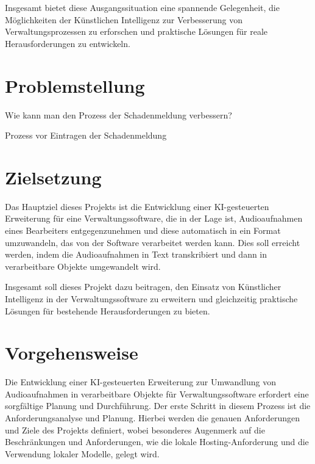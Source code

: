 \documentclass[12pt,a4paper,parskip=full]{scrartcl}
\begin{document}
Insgesamt bietet diese Ausgangssituation eine spannende Gelegenheit, die Möglichkeiten der Künstlichen Intelligenz zur Verbesserung von Verwaltungsprozessen zu erforschen und praktische Lösungen für reale Herausforderungen zu entwickeln.


\section*{Problemstellung}
Wie kann man den Prozess der Schadenmeldung verbessern?

Prozess vor Eintragen der Schadenmeldung

\section*{Zielsetzung}
Das Hauptziel dieses Projekts ist die Entwicklung einer KI-gesteuerten Erweiterung für eine Verwaltungssoftware, die in der Lage ist, Audioaufnahmen eines Bearbeiters entgegenzunehmen und diese automatisch in ein Format umzuwandeln, das von der Software verarbeitet werden kann.
Dies soll erreicht werden, indem die Audioaufnahmen in Text transkribiert und dann in verarbeitbare Objekte umgewandelt wird.




Insgesamt soll dieses Projekt dazu beitragen, den Einsatz von Künstlicher Intelligenz in der Verwaltungssoftware zu erweitern und gleichzeitig praktische Lösungen für bestehende Herausforderungen zu bieten.

\section*{Vorgehensweise}
Die Entwicklung einer KI-gesteuerten Erweiterung zur Umwandlung von Audioaufnahmen in verarbeitbare Objekte für Verwaltungssoftware erfordert eine sorgfältige Planung und Durchführung.
Der erste Schritt in diesem Prozess ist die Anforderungsanalyse und Planung.
Hierbei werden die genauen Anforderungen und Ziele des Projekts definiert, wobei besonderes Augenmerk auf die Beschränkungen und Anforderungen, wie die lokale Hosting-Anforderung und die Verwendung lokaler Modelle, gelegt wird.
\end{document}
